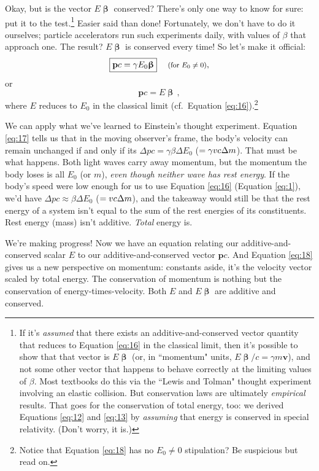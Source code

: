 \documentclass[12pt]{article}
\renewcommand{\vv}[1]{\mathbf{#1}}
\newcommand{\vvbeta}{\bm{\upbeta}}
\begin{document}
Okay, but is the vector $E \vvbeta$ conserved? There's only one way to know for sure: put it to the test.\footnote{If it's \emph{assumed} that there exists an additive-and-conserved vector quantity that reduces to Equation \ref{eq:16} in the classical limit, then it's possible to show that that vector is $E \vvbeta$ (or, in ``momentum" units, $E \vvbeta/c = \gamma m \vv v$), and not some other vector that happens to behave correctly at the limiting values of $\beta$. Most textbooks do this via the ``Lewis and Tolman" thought experiment involving an elastic collision. But conservation laws are ultimately \emph{empirical} results. That goes for the conservation of total energy, too: we derived Equations \ref{eq:12} and \ref{eq:13} by \emph{assuming} that energy is conserved in special relativity. (Don't worry, it is.)} Easier said than done! Fortunately, we don't have to do it ourselves; particle accelerators run such experiments daily, with values of $\beta$ that approach one. The result? $E \vvbeta$ is conserved every time! So let's make it official:
\begin{equation}\label{eq:17}
\boxed{\vv p c = \gamma E_0 \vvbeta}  \quad \textrm{\footnotesize{ (for $E_0 \neq 0$)}},
\end{equation}
or
\begin{equation}\label{eq:18}
\boxed{\vv p c = E \vvbeta} \, ,
\end{equation}
where $E$ reduces to $E_0$ in the classical limit (cf.\ Equation \ref{eq:16}).\footnote{Notice that Equation \ref{eq:18} has no $E_0 \neq 0$ stipulation? Be suspicious but read on.}

We can apply what we've learned to Einstein's thought experiment. Equation \ref{eq:17} tells us that in the moving observer's frame, the body's velocity can remain unchanged if and only if its $\Delta p c = \gamma \beta \Delta E_0$ ($= \gamma v c \mkern.5mu \Delta m$). That must be what happens. Both light waves carry away momentum, but the momentum the body loses is all $E_0$ (or $m$), \emph{even though neither wave has rest energy}. If the body's speed were low enough for us to use Equation \ref{eq:16} (Equation \ref{eq:1}), we'd have $\Delta p c \approx \beta \Delta E_0$ ($ = v c \mkern.5mu \Delta m$), and the takeaway would still be that the rest energy of a system isn't equal to the sum of the rest energies of its constituents. Rest energy (mass) isn't additive. \emph{Total} energy is.

We're making progress! Now we have an equation relating our additive-and-conserved scalar $E$ to our additive-and-conserved vector $\vv p c$. And Equation \ref{eq:18} gives us a new perspective on momentum: constants aside, it's the velocity vector scaled by total energy. The conservation of momentum is nothing but the conservation of energy-times-velocity. Both $E$ and $E \vvbeta$ are additive and conserved.
\end{document}
